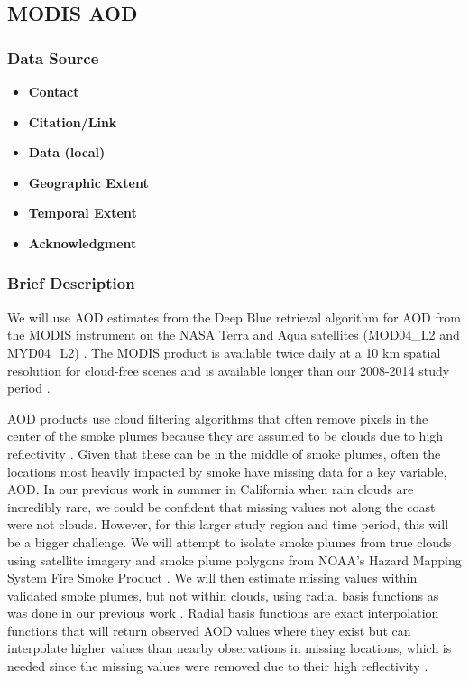 \subsection{MODIS AOD}

\subsubsection*{Data Source}

\begin{itemize}[nolistsep]
\item \textbf{Contact}
\item \textbf{Citation/Link}
\item \textbf{Data (local)}
\item \textbf{Geographic Extent}
\item \textbf{Temporal Extent}
\item \textbf{Acknowledgment}
\end{itemize}

\subsubsection*{Brief Description}

We will use AOD estimates from the Deep Blue retrieval algorithm for AOD from the MODIS instrument on the NASA Terra and Aqua satellites (MOD04\_L2 and MYD04\_L2) \citep{Sayer2013}. The MODIS product is available twice daily at a 10 km spatial resolution for cloud-free scenes and is available longer than our 2008-2014  study period 
\citep{MODISMOD04L22017,MODISMYD04L22017}.  

AOD products use cloud filtering algorithms that often remove pixels in the center of the smoke plumes because they are assumed to be clouds due to high reflectivity \citep{kondragunta_revisions_2009}. Given that these can be in the middle of smoke plumes, often the locations most heavily impacted by smoke have missing data for a key variable, AOD. In our previous work in summer in California when rain clouds are incredibly rare, we could be confident that missing values not along the coast were not clouds. However, for this larger study region and time period, this will be a bigger challenge. We will attempt to isolate smoke plumes from true clouds using satellite imagery and smoke plume polygons from NOAA's Hazard Mapping System Fire Smoke Product  \citep{NOAAHazMap2017}. We will then estimate missing values within validated smoke plumes, but not within clouds, using radial basis functions as was done in our previous work \citep{Reid2015}. Radial basis functions are exact interpolation functions that will return observed AOD values where they exist but can interpolate higher values than nearby observations in missing locations, which is needed since the missing values were removed due to their high reflectivity \citep{Reid2015}.


